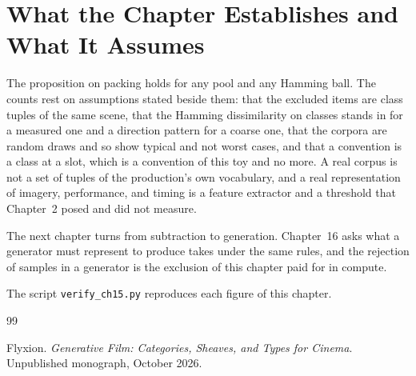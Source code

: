 \documentclass[11pt,twoside,openright]{book}
\theoremstyle{plain}
\theoremstyle{definition}
\theoremstyle{remark}
\begin{document}
\section{What the Chapter Establishes and What It Assumes}\label{sec:limits15}

The proposition on packing holds for any pool and any Hamming ball. The counts rest on assumptions stated beside them: that the excluded items are class tuples of the same scene, that the Hamming dissimilarity on classes stands in for a measured one and a direction pattern for a coarse one, that the corpora are random draws and so show typical and not worst cases, and that a convention is a class at a slot, which is a convention of this toy and no more. A real corpus is not a set of tuples of the production's own vocabulary, and a real representation of imagery, performance, and timing is a feature extractor and a threshold that Chapter~2 posed and did not measure.

The next chapter turns from subtraction to generation. Chapter~16 asks what a generator must represent to produce takes under the same rules, and the rejection of samples in a generator is the exclusion of this chapter paid for in compute.

The script \texttt{verify\_ch15.py} reproduces each figure of this chapter.

\begin{thebibliography}{99}

Flyxion.
\newblock \emph{Generative Film: Categories, Sheaves, and Types for Cinema}.
\newblock Unpublished monograph, October 2026.

\end{thebibliography}
\end{document}
